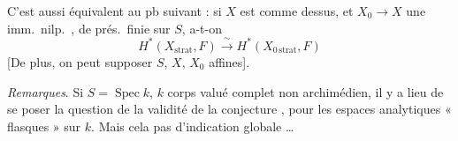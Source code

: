 \documentclass[11pt,a4paper]{article}
\begin{document}

C'est aussi équivalent au pb suivant : si $X$ est comme dessus, et
$X_0 \to X$ une imm.\ nilp.\ \ill{},  de prés.\ finie sur
$S$, a-t-on
\[
  H^{*}(X_{\mathrm{strat}}, F) \xrightarrow{\ \sim\ }
  H^{*}(X_{0\,\mathrm{strat}}, F)
\]
[De plus, on peut supposer $S$, $X$, $X_0$ affines].

\emph{Remarques}. Si $S = \operatorname{Spec} k$, $k$ corps valué complet
non archimédien, il y a lieu de  se poser la question de la
validité de la conjecture , pour les 
espaces analytiques \struck{\ill{}} « flasques » sur $k$. Mais cela
 \ill{} pas d'indication globale \ill{}
 \ldots{}
\end{document}
